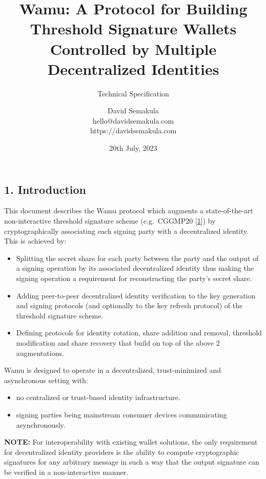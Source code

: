 \documentclass[
]{article}
\title{Wamu: A Protocol for Building Threshold Signature Wallets
Controlled by Multiple Decentralized Identities}
\subtitle{Technical Specification}
\author{David Semakula\\
hello@davidsemakula.com\\
https://davidsemakula.com}
\date{20th July, 2023}
\providecommand{\tightlist}{%
  \setlength{\itemsep}{0pt}\setlength{\parskip}{0pt}}
\begin{document}
\maketitle

{
\setcounter{tocdepth}{3}
\tableofcontents
}
\hypertarget{introduction}{%
\subsection{1. Introduction}\label{introduction}}

This document describes the Wamu protocol which augments a
state-of-the-art non-interactive threshold signature scheme
(e.g.~CGGMP20 {[}\protect\hyperlink{ref-cggmp20}{1}{]}) by
cryptographically associating each signing party with a decentralized
identity. This is achieved by:

\begin{itemize}
\tightlist
\item
  Splitting the secret share for each party between the party and the
  output of a signing operation by its associated decentralized identity
  thus making the signing operation a requirement for reconstructing the
  party's secret share.
\item
  Adding peer-to-peer decentralized identity verification to the key
  generation and signing protocols (and optionally to the key refresh
  protocol) of the threshold signature scheme.
\item
  Defining protocols for identity rotation, share addition and removal,
  threshold modification and share recovery that build on top of the
  above 2 augmentations.
\end{itemize}

Wamu is designed to operate in a decentralized, trust-minimized and
asynchronous setting with:

\begin{itemize}
\tightlist
\item
  no centralized or trust-based identity infrastructure.
\item
  signing parties being mainstream consumer devices communicating
  asynchronously.
\end{itemize}

\textbf{NOTE:} For interoperability with existing wallet solutions, the
only requirement for decentralized identity providers is the ability to
compute cryptographic signatures for any arbitrary message in such a way
that the output signature can be verified in a non-interactive manner.
\end{document}
